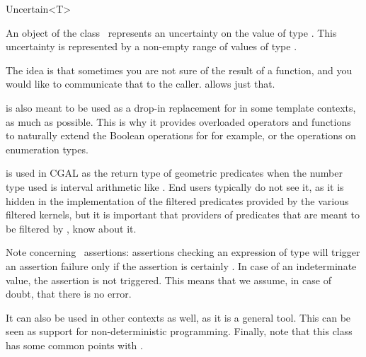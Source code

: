 

\begin{ccRefClass}{Uncertain<T>}

\ccDefinition

An object of the class \ccClassTemplateName\ represents an uncertainty on the
value of type .  This uncertainty is represented by a non-empty range of
values of type .

The idea is that sometimes you are not sure of the result of a function, and
you would like to communicate that to the caller.   allows
just that.

 is also meant to be used as a drop-in replacement for
 in some template contexts, as much as possible.  This is why it
provides overloaded operators and functions to naturally extend the Boolean
operations for  for example, or the operations on
enumeration types.

 is used in CGAL as the return type of geometric predicates
when the number type used is interval arithmetic like .  End
users typically do not see it, as it is hidden in the implementation of the
filtered predicates provided by the various filtered kernels, but it is
important that providers of predicates that are meant to be filtered by
, know about it.

Note concerning \cgal\ assertions: assertions checking an expression of type
 will trigger an assertion failure only if the assertion
is certainly .  In case of an indeterminate value, the assertion is not
triggered.  This means that we assume, in case of doubt, that there is no
error.

It can also be used in other contexts as well, as it is a general tool.
This can be seen as support for non-deterministic programming.
Finally, note that this class has some common points with .


\end{ccRefClass}
